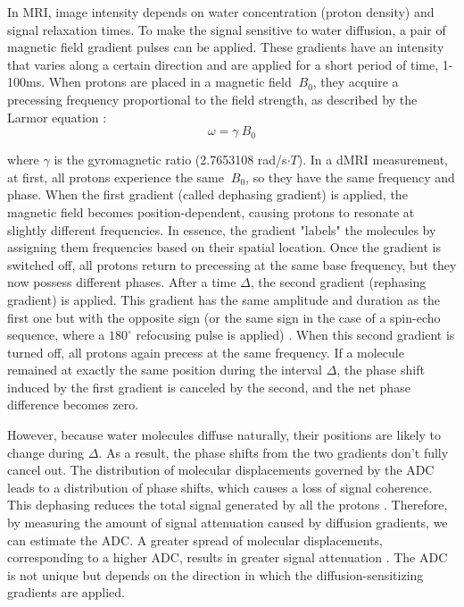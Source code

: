 In MRI, image intensity depends on water concentration (proton density) and signal relaxation times. To make the signal sensitive to water diffusion, a pair of magnetic field gradient pulses can be applied. These gradients have an intensity that varies along a certain direction and are applied for a short period of time, 1-100ms.
When protons are placed in a magnetic field ${\ B}_0$, they acquire a precessing frequency proportional to the field strength, as described by the Larmor equation \cite{Jones2013}: 
\begin{equation}
\omega = \gamma{\ B}_0
\end{equation}

where $\gamma$ is the gyromagnetic ratio (2.7653108 rad/s$\cdot{T}$).
In a dMRI measurement, at first, all protons experience the same ${\ B}_0$, so they have the same frequency and phase. When the first gradient (called dephasing gradient) is applied, the magnetic field becomes position-dependent, causing protons to resonate at slightly different frequencies. In essence, the gradient "labels" the molecules by assigning them frequencies based on their spatial location. Once the gradient is switched off, all protons return to precessing at the same base frequency, but they now possess different phases. After a time $\Delta$, the second gradient (rephasing gradient) is applied. This gradient has the same amplitude and duration as the first one but with the opposite sign (or the same sign in the case of a spin-echo sequence, where a $180^\circ$ refocusing pulse is applied) \cite{Mori20142}.  When this second gradient is turned off, all protons again precess at the same frequency. If a molecule remained at exactly the same position during the interval $\Delta$, the phase shift induced by the first gradient is canceled by the second, and the net phase difference becomes zero.

However, because water molecules diffuse naturally, their positions are likely to change during $\Delta$. As a result, the phase shifts from the two gradients don't fully cancel out. The distribution of molecular displacements governed by the ADC leads to a distribution of phase shifts, which causes a loss of signal coherence. This dephasing reduces the total signal generated by all the protons \cite{LeBihan2003}. Therefore, by measuring the amount of signal attenuation caused by diffusion gradients, we can estimate the ADC. A greater spread of molecular displacements, corresponding to a higher ADC, results in greater signal attenuation \cite{Jones2013}. The ADC is not unique but depends on the direction in which the diffusion-sensitizing gradients are applied. 


